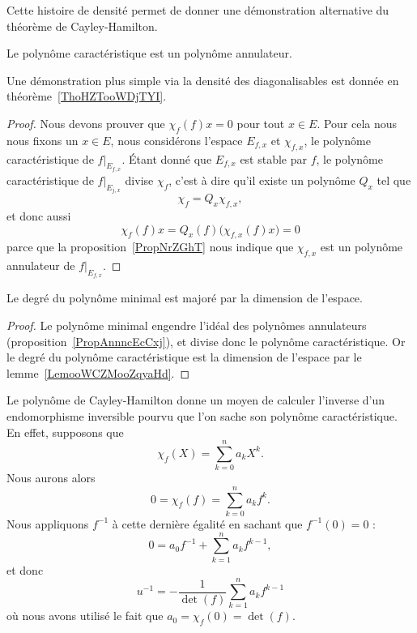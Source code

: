 Cette histoire de densité permet de donner une démonstration alternative du théorème de Cayley-Hamilton.
\begin{theorem}   \label{ThoCalYWLbJQ}
    Le polynôme caractéristique est un polynôme annulateur.
\end{theorem}

Une démonstration plus simple via la densité des diagonalisables est donnée en théorème~\ref{ThoHZTooWDjTYI}.
\begin{proof}
    Nous devons prouver que \( \chi_f(f)x=0\) pour tout \( x\in E\). Pour cela nous nous fixons un \( x\in E\), nous considérons l'espace \( E_{f,x}\) et \( \chi_{f,x}\), le polynôme caractéristique de \( f|_{E_{f,x}}\). Étant donné que \( E_{f,x}\) est stable par \( f\), le polynôme caractéristique de \( f|_{E_{j,x}}\) divise \( \chi_f\), c'est à dire qu'il existe un polynôme \( Q_x\) tel que
    \begin{equation}
        \chi_f=Q_x\chi_{f,x},
    \end{equation}
    et donc aussi
    \begin{equation}
        \chi_f(f)x=Q_x(f)\big( \chi_{f,x}(f)x \big)=0
    \end{equation}
    parce que la proposition~\ref{PropNrZGhT} nous indique que \( \chi_{f,x}\) est un polynôme annulateur de \( f|_{E_{f,x}}\).
\end{proof}

\begin{corollary}
    Le degré du polynôme minimal est majoré par la dimension de l'espace.
\end{corollary}

\begin{proof}
    Le polynôme minimal engendre l'idéal des polynômes annulateurs (proposition~\ref{PropAnnncEcCxj}), et divise donc le polynôme caractéristique. Or le degré du polynôme caractéristique est la dimension de l'espace par le lemme~\ref{LemooWCZMooZqyaHd}.
\end{proof}

\begin{example}
    Le polynôme de Cayley-Hamilton donne un moyen de calculer l'inverse d'un endomorphisme inversible pourvu que l'on sache son polynôme caractéristique. En effet, supposons que
    \begin{equation}
        \chi_f(X)=\sum_{k=0}^na_kX^k.
    \end{equation}
    Nous aurons alors
    \begin{equation}
        0=\chi_f(f)=\sum_{k=0}^na_kf^k.
    \end{equation}
    Nous appliquons \( f^{-1}\) à cette dernière égalité en sachant que \( f^{-1}(0)=0\) :
    \begin{equation}
        0=a_0f^{-1}+\sum_{k=1}^na_kf^{k-1},
    \end{equation}
    et donc
    \begin{equation}
        u^{-1}=-\frac{1}{ \det(f) }\sum_{k=1}^na_kf^{k-1}
    \end{equation}
    où nous avons utilisé le fait que \( a_0=\chi_f(0)=\det(f)\).
\end{example}

